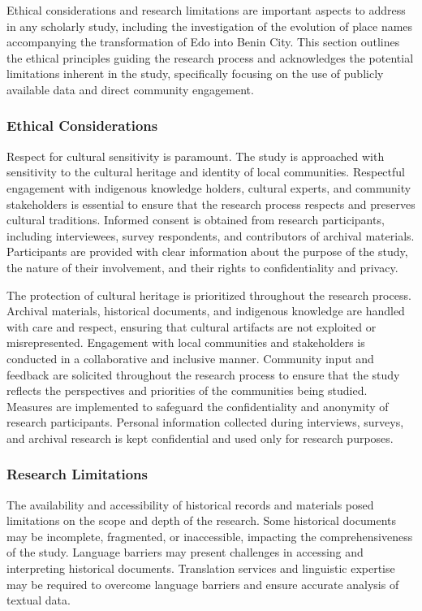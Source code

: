Ethical considerations and research limitations are important aspects to address in any scholarly study, including the investigation of the evolution of place names accompanying the transformation of Edo into Benin City. This section outlines the ethical principles guiding the research process and acknowledges the potential limitations inherent in the study, specifically focusing on the use of publicly available data and direct community engagement.

\subsubsection{Ethical Considerations}

Respect for cultural sensitivity is paramount. The study is approached with sensitivity to the cultural heritage and identity of local communities. Respectful engagement with indigenous knowledge holders, cultural experts, and community stakeholders is essential to ensure that the research process respects and preserves cultural traditions. Informed consent is obtained from research participants, including interviewees, survey respondents, and contributors of archival materials. Participants are provided with clear information about the purpose of the study, the nature of their involvement, and their rights to confidentiality and privacy.

The protection of cultural heritage is prioritized throughout the research process. Archival materials, historical documents, and indigenous knowledge are handled with care and respect, ensuring that cultural artifacts are not exploited or misrepresented. Engagement with local communities and stakeholders is conducted in a collaborative and inclusive manner. Community input and feedback are solicited throughout the research process to ensure that the study reflects the perspectives and priorities of the communities being studied. Measures are implemented to safeguard the confidentiality and anonymity of research participants. Personal information collected during interviews, surveys, and archival research is kept confidential and used only for research purposes.

\subsubsection{Research Limitations}

The availability and accessibility of historical records and materials posed limitations on the scope and depth of the research. Some historical documents may be incomplete, fragmented, or inaccessible, impacting the comprehensiveness of the study. Language barriers may present challenges in accessing and interpreting historical documents. Translation services and linguistic expertise may be required to overcome language barriers and ensure accurate analysis of textual data.

